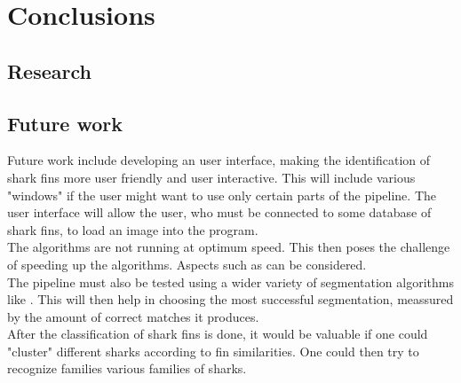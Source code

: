 \documentclass[a4paper,10pt]{article}
\begin{document}
\subsection{}


\newpage
\section{Conclusions}
\subsection{Research}


\subsection{}


\subsection{Future work}
Future work include developing an user interface, making the identification of shark fins more user friendly and user interactive.
This will include various "windows" if the user might want to use only certain parts of the pipeline.  The user interface will allow the 
user, who must be connected to some database of shark fins, to load an image into the program. \\

The algorithms are not running at optimum speed.  This then poses the challenge of speeding up the algorithms. Aspects such as can be considered.\\

The pipeline must also be tested using a wider variety of segmentation algorithms like . This will then help in choosing the most successful segmentation,
meassured by the amount of correct matches it produces. \\ 

After the classification of shark fins is done, it would be valuable if one could "cluster" different sharks according to fin similarities.
One could then try to recognize families various families of sharks. \\

\newpage

\end{document}
